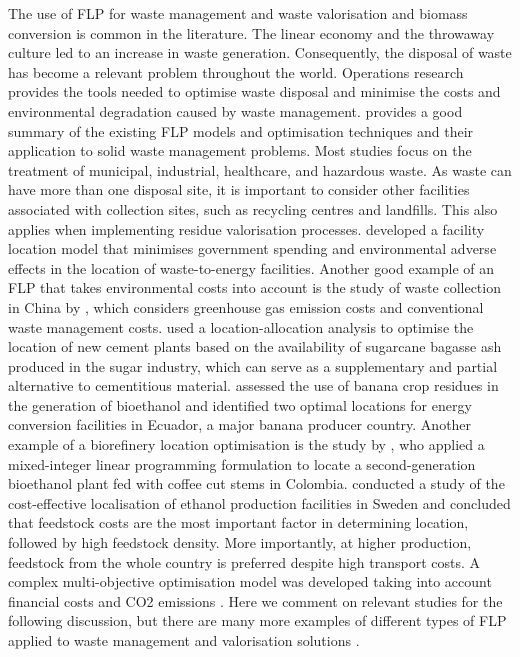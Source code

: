 The use of FLP for waste management and waste valorisation and biomass conversion is common in the literature. The linear economy and the throwaway culture led to an increase in waste generation. Consequently, the disposal of waste has become a relevant problem throughout the world. Operations research provides the tools needed to optimise waste disposal and minimise the costs and environmental degradation caused by waste management. \cite{adeleke2020facility} provides a good summary of the existing FLP models and optimisation techniques and their application to solid waste management problems. Most studies focus on the treatment of municipal, industrial, healthcare, and hazardous waste. As waste can have more than one disposal site, it is important to consider other facilities associated with collection sites, such as recycling centres and landfills. This also applies when implementing residue valorisation processes.\cite{hu2017bi} developed a facility location model that minimises government spending and environmental adverse effects in the location of waste-to-energy facilities. Another good example of an FLP that takes environmental costs into account is the study of waste collection in China by \cite{wu2020optimization}, which considers greenhouse gas emission costs and conventional waste management costs. \cite{athira2020effective} used a location-allocation analysis to optimise the location of new cement plants based on the availability of sugarcane bagasse ash produced in the sugar industry, which can serve as a supplementary and partial alternative to cementitious material. \cite{guerrero2016gis} assessed the use of banana crop residues in the generation of bioethanol and identified two optimal locations for energy conversion facilities in Ecuador, a major banana producer country. Another example of a biorefinery location optimisation is the study by \cite{duarte2014facility}, who applied a mixed-integer linear programming formulation to locate a second-generation bioethanol plant fed with coffee cut stems in Colombia. \cite{nordin2022optimal} conducted a study of the cost-effective localisation of ethanol production facilities in Sweden and concluded that feedstock costs are the most important factor in determining location, followed by high feedstock density. More importantly, at higher production, feedstock from the whole country is preferred despite high transport costs. A complex multi-objective optimisation model was developed taking into account financial costs and CO2 emissions \cite{harris2014hybrid}. Here we comment on relevant studies for the following discussion, but there are many more examples of different types of FLP applied to waste management and valorisation solutions \citep{bojic2018location, harris2009multi, kocoloski2011impacts, wetterlund2012optimal}.

